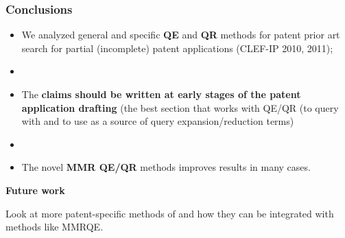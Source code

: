 \documentclass[xcolor=x11names,compress]{beamer}
\renewcommand{\(}{\begin{columns}}
\renewcommand{\)}{\end{columns}}
\newcommand{\<}[1]{\begin{column}{#1}}
\renewcommand{\>}{\end{column}}
\begin{document}
\begin{frame}
\frametitle{Conclusions}
\begin{itemize}

\item We analyzed general and specific \textbf{QE} and \textbf{QR} methods for
patent prior art search for partial (incomplete) patent applications
(CLEF-IP 2010, 2011);
\item[]
\item The \textbf{claims should be written at early stages of the
patent application drafting} (the best section that works with QE/QR (to query with and to use as a source of query expansion/reduction terms)
\item[]
\item The novel \textbf{MMR QE/QR} methods improves results in many cases. 
\end{itemize}


{\color{DeepSkyBlue4}\textbf{Future work}}

Look at more patent-specific methods of and how they
can be integrated with methods like MMRQE. 
\end{frame}

%
% 
\end{document}
